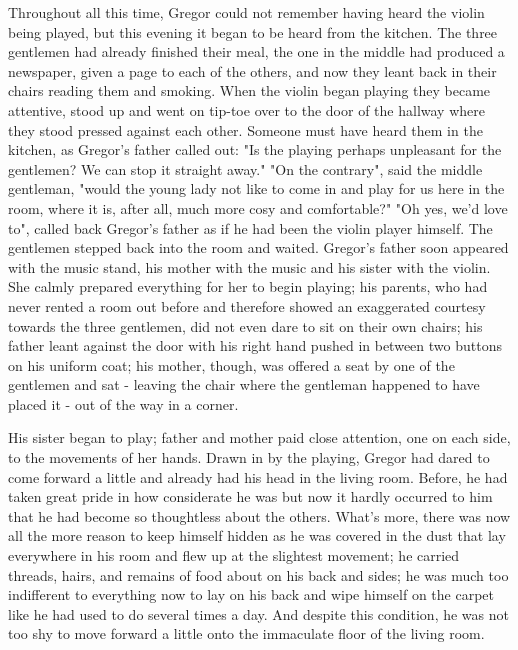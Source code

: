 \documentclass[12pt]{book}
\begin{document}
    Throughout all this time, Gregor could not remember having heard the violin being played, but this evening it began to be heard from the kitchen. The three gentlemen had already finished their meal, the one in the middle had produced a newspaper, given a page to each of the others, and now they leant back in their chairs reading them and smoking. When the violin began playing they became attentive, stood up and went on tip-toe over to the door of the hallway where they stood pressed against each other. Someone must have heard them in the kitchen, as Gregor's father called out: "Is the playing perhaps unpleasant for the gentlemen? We can stop it straight away." "On the contrary", said the middle gentleman, "would the young lady not like to come in and play for us here in the room, where it is, after all, much more cosy and comfortable?" "Oh yes, we'd love to", called back Gregor's father as if he had been the violin player himself. The gentlemen stepped back into the room and waited. Gregor's father soon appeared with the music stand, his mother with the music and his sister with the violin. She calmly prepared everything for her to begin playing; his parents, who had never rented a room out before and therefore showed an exaggerated courtesy towards the three gentlemen, did not even dare to sit on their own chairs; his father leant against the door with his right hand pushed in between two buttons on his uniform coat; his mother, though, was offered a seat by one of the gentlemen and sat - leaving the chair where the gentleman happened to have placed it - out of the way in a corner.

    His sister began to play; father and mother paid close attention, one on each side, to the movements of her hands. Drawn in by the playing, Gregor had dared to come forward a little and already had his head in the living room. Before, he had taken great pride in how considerate he was but now it hardly occurred to him that he had become so thoughtless about the others. What's more, there was now all the more reason to keep himself hidden as he was covered in the dust that lay everywhere in his room and flew up at the slightest movement; he carried threads, hairs, and remains of food about on his back and sides; he was much too indifferent to everything now to lay on his back and wipe himself on the carpet like he had used to do several times a day. And despite this condition, he was not too shy to move forward a little onto the immaculate floor of the living room.
\end{document}
